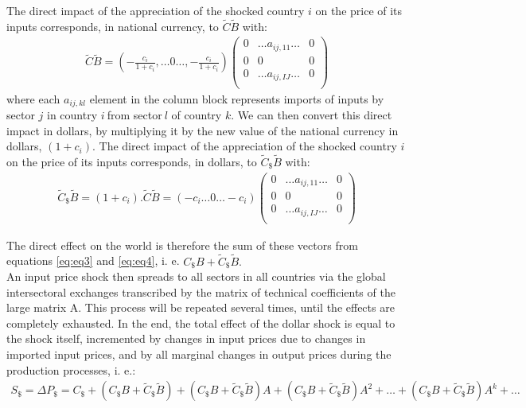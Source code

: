 \documentclass[11pt,a4paper]{article}
\begin{document}
The direct impact of the appreciation of the shocked country $i$ on the price of its inputs corresponds, in national currency, to ${\tilde{C}}{\tilde{B}}$ with: 
\begin{eqnarray}
{\tilde{C}}{\tilde{B}}=\left(-\frac{c_i}{1+c_i},\ldots0\ldots,-\frac{c_i}{1+c_i} \right)\left(\begin{matrix}0&\ldots{{{a}}_{ij,11}}\ldots&0\\0&0&0\\0&\ldots{{a}_{{ij,IJ}}}\ldots&0\\\end{matrix}\right) 
\label{eq:eq4}
 \end{eqnarray}
where each ${{{a}}_{{ij,kl}}}$ element in the column block represents imports of inputs by sector $j$ in country $i~$from sector$~l$ of country $k$.
We can then convert this direct impact in dollars, by multiplying it by the new value of the national currency in dollars, $\left(1+c_i\right)$. The direct impact of the appreciation of the shocked country $i$ on the price of its inputs corresponds, in dollars, to ${{\tilde{C}}_{\$}}{\tilde{B}}$ with: 
\begin{eqnarray}
{{\tilde{C}}_{\$}}{\tilde{B}}=\left(1+c_i\right).{\tilde{C}}{\tilde{B}}=
\left(-{{{c}}_{i}}\ldots0\ldots-{{{c}}_{i}}\right)\left(\begin{matrix}0&\ldots{{{a}}_{ij,11}}\ldots&0\\0&0&0\\0&\ldots{{a}_{{ij,IJ}}}\ldots&0\\\end{matrix}\right) 
\label{eq:eq4}
 \end{eqnarray}







The direct effect on the world is therefore the sum of these vectors from equations  \ref{eq:eq3} and \ref{eq:eq4}, i. e. ${{C}_{\$}}{B}+{{\tilde{C}}_{\$}}{\tilde{B}}.~$\\
An input price shock then spreads to all sectors in all countries via the global intersectoral exchanges transcribed by the matrix of technical coefficients of the large matrix A. This process will be repeated several times, until the effects are completely exhausted.
In the end, the total effect of the dollar shock is equal to the shock itself, incremented by changes in input prices due to changes in imported input prices, and by all marginal changes in output prices during the production processes, i. e.:\\
\begin{eqnarray*}
S_\$=\Delta{{P}_{\$}}=C_{\$}+(C_{\$}B+{{{\tilde{C}}}_{\$}}{\tilde{B}})+\left({{C}_{\$}}{B}+{{{\tilde{C}}}_{\$}}{\tilde{B}}\right){A}+\left({{C}_{\$}}{B}+{{{\tilde{C}}}_{\$}}{\tilde{B}}\right){{{A}}^{2}}+\ldots+\left({{C}_{\$}}{B}+{{{\tilde{C}}}_{\$}}{\tilde{B}}\right)A^k +\ldots \\
\end{eqnarray*}
 
\end{document}
